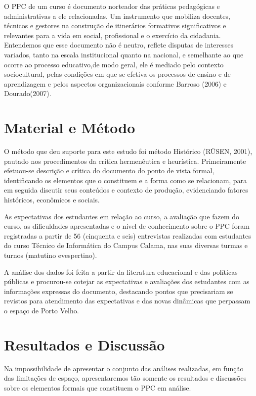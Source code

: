 \documentclass[article,12pt,onesidea,4paper,english,brazil]{abntex2}
\begin{document}
	O PPC de um curso é documento norteador das práticas pedagógicas e administrativas a ele relacionadas. Um instrumento que mobiliza docentes, técnicos e gestores na construção de itinerários formativos significativos e relevantes para a vida em social, profissional e o exercício da cidadania. Entendemos que esse documento não é neutro, reflete disputas de interesses variados, tanto na escala institucional quanto na nacional, e semelhante ao que ocorre ao processo educativo,de modo geral, ele é mediado pelo contexto sociocultural, pelas condições em que se efetiva os processos de ensino e de aprendizagem e pelos aspectos organizacionais conforme Barroso (2006) e Dourado(2007).
	
	\section*{Material e Método}
	
	O método que deu suporte para este estudo foi método Histórico (RÜSEN, 2001), pautado nos procedimentos da crítica hermenêutica e heurística. Primeiramente efetuou-se descrição e crítica do documento do ponto de vista formal, identificando os elementos que o constituem e a forma como se relacionam, para em seguida discutir seus conteúdos e contexto de produção, evidenciando fatores históricos, econômicos e sociais.
	
	As expectativas dos estudantes em relação ao curso, a avaliação que fazem do curso, as dificuldades apresentadas e o nível de conhecimento sobre o PPC foram registradas a partir de 56 (cinquenta e seis) entrevistas realizadas com estudantes do curso Técnico de Informática do Campus Calama, nas suas diversas turmas e turnos (matutino evespertino).  
	
	A análise dos dados foi feita a partir da literatura educacional e das políticas públicas e procurou-se cotejar as expectativas e avaliações dos estudantes com as informações expressas do documento, destacando pontos que precisariam se revistos para atendimento das expectativas e das novas dinâmicas que perpassam o espaço de Porto Velho.
	
	\section*{Resultados e Discussão}
	
	Na impossibilidade de apresentar o conjunto das análises realizadas, em função das limitações de espaço, apresentaremos tão somente os resultados e discussões sobre os elementos formais que constituem o PPC em análise.
	
\end{document}
